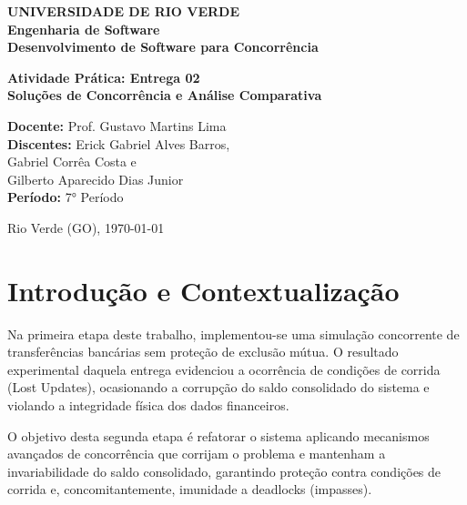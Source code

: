 \documentclass[12pt,a4paper]{article}
\begin{document}
\sloppy

\begin{titlepage}
\begin{center}
\textbf{\large UNIVERSIDADE DE RIO VERDE}\\[1cm]
\textbf{\large Engenharia de Software}\\[1cm]
\textbf{\large Desenvolvimento de Software para Concorrência}\\[1cm]

\vspace{2cm}

\textbf{\LARGE Atividade Prática: Entrega 02}\\[0.5cm]
\textbf{\Large Soluções de Concorrência e Análise Comparativa}\\[3cm]
\end{center}

\begin{flushright}
\textbf{Docente:} Prof. Gustavo Martins Lima \\[0.2cm]
\textbf{Discentes:} Erick Gabriel Alves Barros, \\
Gabriel Corrêa Costa e \\
Gilberto Aparecido Dias Junior \\[0.2cm]
\textbf{Período:} 7° Período
\end{flushright}

\begin{center}
\vfill
Rio Verde (GO), \today
\end{center}
\end{titlepage}

\section{Introdução e Contextualização}

\noindent Na primeira etapa deste trabalho, implementou-se uma simulação concorrente de transferências bancárias sem proteção de exclusão mútua. O resultado experimental daquela entrega evidenciou a ocorrência de condições de corrida (Lost Updates), ocasionando a corrupção do saldo consolidado do sistema e violando a integridade física dos dados financeiros.

\noindent O objetivo desta segunda etapa é refatorar o sistema aplicando mecanismos avançados de concorrência que corrijam o problema e mantenham a invariabilidade do saldo consolidado, garantindo proteção contra condições de corrida e, concomitantemente, imunidade a deadlocks (impasses).
\end{document}
